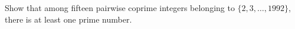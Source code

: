 Show that among fifteen pairwise coprime integers belonging to $\{2, 3, \ldots, 1992\}$, there is at least one prime number.
